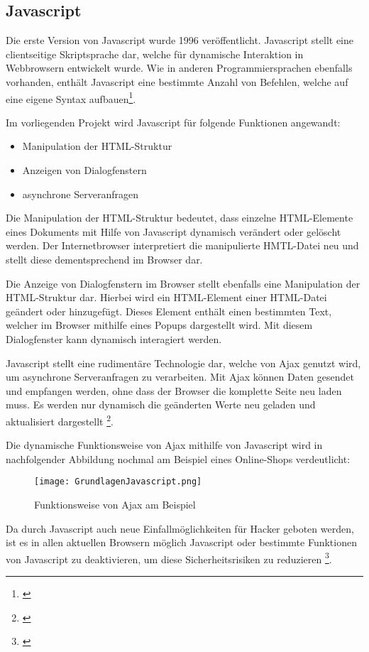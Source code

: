\subsection{Javascript}
\label{sec:Javascript}

Die erste Version von Javascript wurde 1996 veröffentlicht. Javascript stellt eine clientseitige Skriptsprache dar, welche für dynamische Interaktion in Webbrowsern entwickelt wurde. Wie in anderen Programmiersprachen ebenfalls vorhanden, enthält Javascript eine bestimmte Anzahl von Befehlen, welche auf eine eigene Syntax aufbauen\footnote{\citet{powers2007}}.

Im vorliegenden Projekt wird Javascript für folgende Funktionen angewandt:

\begin{itemize}
  \item Manipulation der HTML-Struktur
  \item Anzeigen von Dialogfenstern
  \item asynchrone Serveranfragen
\end{itemize}

Die Manipulation der HTML-Struktur bedeutet, dass einzelne HTML-Elemente eines Dokuments mit Hilfe von Javascript dynamisch verändert oder gelöscht werden. Der Internetbrowser interpretiert die manipulierte HMTL-Datei neu und stellt diese dementsprechend im Browser dar.

Die Anzeige von Dialogfenstern im Browser stellt ebenfalls eine Manipulation der HTML-Struktur dar. Hierbei wird ein HTML-Element einer HTML-Datei geändert oder hinzugefügt. Dieses Element enthält einen bestimmten Text, welcher im Browser mithilfe eines Popups dargestellt wird. Mit diesem Dialogfenster kann dynamisch interagiert werden.

Javascript stellt eine rudimentäre Technologie dar, welche von Ajax genutzt wird, um asynchrone Serveranfragen zu verarbeiten. Mit Ajax können Daten gesendet und empfangen werden, ohne dass der Browser die komplette Seite neu laden muss. Es werden nur dynamisch die geänderten Werte neu geladen und aktualisiert dargestellt \footnote{\citet{heinle2006}}.

Die dynamische Funktionsweise von Ajax mithilfe von Javascript wird in nachfolgender Abbildung nochmal am Beispiel eines Online-Shops verdeutlicht:

\begin{figure}[htb]
\centering
\texttt{[image: GrundlagenJavascript.png]}
\caption[Grundlagen Javascript]{Funktionsweise von Ajax am Beispiel\protect\footnotemark}
\label{fig:Bildergalerie}
\end{figure}

Da durch Javascript auch neue Einfallmöglichkeiten für Hacker geboten werden, ist es in allen aktuellen Browsern möglich Javascript oder bestimmte Funktionen von Javascript zu deaktivieren, um diese Sicherheitsrisiken zu reduzieren \footnote{\citet{steyer2010}}.